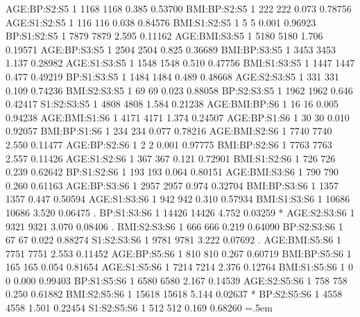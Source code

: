\documentclass[runningheads]{llncs}
\newenvironment{lcverbatim}
 {\SaveVerbatim{cverb}}
 {\endSaveVerbatim
  \flushleft\fboxrule=0pt\fboxsep=.5em
  \colorbox{cverbbg}{%
    \makebox[\dimexpr\linewidth-2\fboxsep][l]{\BUseVerbatim{cverb}}%
  }
  \endflushleft
}
\begin{document}
\begin{lcverbatim}
AGE:BP:S2:S5            1   1168    1168   0.385  0.53700    
BMI:BP:S2:S5            1    222     222   0.073  0.78756    
AGE:S1:S2:S5            1    116     116   0.038  0.84576    
BMI:S1:S2:S5            1      5       5   0.001  0.96923    
BP:S1:S2:S5             1   7879    7879   2.595  0.11162    
AGE:BMI:S3:S5           1   5180    5180   1.706  0.19571    
AGE:BP:S3:S5            1   2504    2504   0.825  0.36689    
BMI:BP:S3:S5            1   3453    3453   1.137  0.28982    
AGE:S1:S3:S5            1   1548    1548   0.510  0.47756    
BMI:S1:S3:S5            1   1447    1447   0.477  0.49219    
BP:S1:S3:S5             1   1484    1484   0.489  0.48668    
AGE:S2:S3:S5            1    331     331   0.109  0.74236    
BMI:S2:S3:S5            1     69      69   0.023  0.88058    
BP:S2:S3:S5             1   1962    1962   0.646  0.42417    
S1:S2:S3:S5             1   4808    4808   1.584  0.21238    
AGE:BMI:BP:S6           1     16      16   0.005  0.94238    
AGE:BMI:S1:S6           1   4171    4171   1.374  0.24507    
AGE:BP:S1:S6            1     30      30   0.010  0.92057    
BMI:BP:S1:S6            1    234     234   0.077  0.78216    
AGE:BMI:S2:S6           1   7740    7740   2.550  0.11477    
AGE:BP:S2:S6            1      2       2   0.001  0.97775    
BMI:BP:S2:S6            1   7763    7763   2.557  0.11426    
AGE:S1:S2:S6            1    367     367   0.121  0.72901    
BMI:S1:S2:S6            1    726     726   0.239  0.62642    
BP:S1:S2:S6             1    193     193   0.064  0.80151    
AGE:BMI:S3:S6           1    790     790   0.260  0.61163    
AGE:BP:S3:S6            1   2957    2957   0.974  0.32704    
BMI:BP:S3:S6            1   1357    1357   0.447  0.50594    
AGE:S1:S3:S6            1    942     942   0.310  0.57934    
BMI:S1:S3:S6            1  10686   10686   3.520  0.06475 .  
BP:S1:S3:S6             1  14426   14426   4.752  0.03259 *  
AGE:S2:S3:S6            1   9321    9321   3.070  0.08406 .  
BMI:S2:S3:S6            1    666     666   0.219  0.64090    
BP:S2:S3:S6             1     67      67   0.022  0.88274    
S1:S2:S3:S6             1   9781    9781   3.222  0.07692 .  
AGE:BMI:S5:S6           1   7751    7751   2.553  0.11452    
AGE:BP:S5:S6            1    810     810   0.267  0.60719    
BMI:BP:S5:S6            1    165     165   0.054  0.81654    
AGE:S1:S5:S6            1   7214    7214   2.376  0.12764    
BMI:S1:S5:S6            1      0       0   0.000  0.99403    
BP:S1:S5:S6             1   6580    6580   2.167  0.14539    
AGE:S2:S5:S6            1    758     758   0.250  0.61882    
BMI:S2:S5:S6            1  15618   15618   5.144  0.02637 *  
BP:S2:S5:S6             1   4558    4558   1.501  0.22454    
S1:S2:S5:S6             1    512     512   0.169  0.68260    
\end{lcverbatim}
\end{document}
